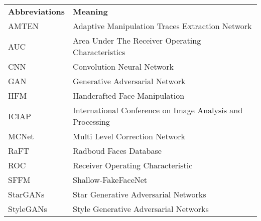 \begin{table}[h]
	\begin{tabular}{l l}
		\textbf{Abbreviations} & \textbf{Meaning}                                   \\
		AMTEN                  & Adaptive Manipulation Traces Extraction Network    \\
		AUC                    & Area Under The Receiver Operating Characteristics  \\
		CNN                    & Convolution Neural Network                         \\
		GAN                    & Generative Adversarial Network                     \\
		HFM                    & Handcrafted Face Manipulation                       \\
		ICIAP                  & International Conference on Image Analysis and Processing \\
		MCNet                  & Multi Level Correction Network                     \\
		RaFT                   & Radboud Faces Database                             \\
		ROC                    & Receiver Operating Characteristic                   \\
		SFFM                   & Shallow-FakeFaceNet                                 \\
		StarGANs               & Star Generative Adversarial Networks               \\
		StyleGANs              & Style Generative Adversarial Networks               \\
	\end{tabular}
\end{table}
\pagebreak